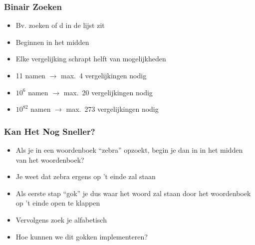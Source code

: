 \documentclass[dutch]{ucll-slides}
\begin{document}
\begin{frame}
  \frametitle{Binair Zoeken}
  \begin{center}
  \end{center}

  \begin{itemize}
    \item Bv. zoeken of d in de lijst zit
    \item Beginnen in het midden
    \item Elke vergelijking schrapt helft van mogelijkheden
    \item 11 namen $\rightarrow$ max.~4 vergelijkingen nodig
    \item $10^6$ namen $\rightarrow$ max.~20 vergelijkingen nodig
    \item $10^{82}$ namen $\rightarrow$ max.~273 vergelijkingen nodig
  \end{itemize}
\end{frame}

\begin{frame}
  \frametitle{Kan Het Nog Sneller?}
  \begin{itemize}
    \item Als je in een woordenboek ``zebra'' opzoekt, begin
          je dan in in het midden van het woordenboek?
    \item Je weet dat zebra ergens op 't einde zal staan
    \item Als eerste stap ``gok'' je dus waar het woord zal staan
          door het woordenboek op 't einde open te klappen
    \item Vervolgens zoek je alfabetisch
    \item Hoe kunnen we dit gokken implementeren?
  \end{itemize}
\end{frame}
\end{document}
